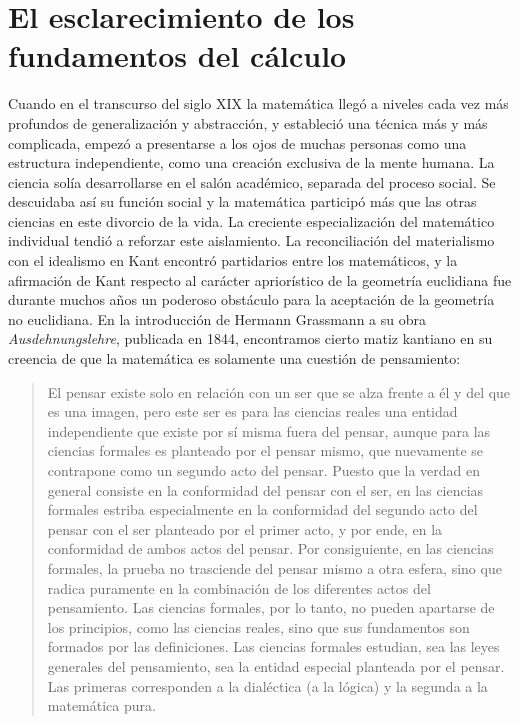 \documentclass[a4paper, 12pt]{article}
\begin{document}
{{\section*{El esclarecimiento de los fundamentos del
cálculo}

Cuando en el transcurso del siglo XIX la matemática llegó a niveles cada vez más
profundos de generalización y abstracción, y estableció una técnica más y más
complicada, empezó a presentarse a los ojos de muchas personas como una
estructura independiente, como una creación exclusiva de la mente humana. La
ciencia solía desarrollarse en el salón académico, separada del proceso social.
Se descuidaba así su función social y la matemática participó más que las otras
ciencias en este divorcio de la vida. La creciente especialización del
matemático individual tendió a reforzar este aislamiento. La reconciliación del
materialismo con el idealismo en Kant encontró partidarios entre los
matemáticos, y la afirmación de Kant respecto al carácter apriorístico de la
geometría euclidiana fue durante muchos años un poderoso obstáculo para la
aceptación de la geometría no euclidiana. En la introducción de Hermann
Grassmann a su obra \textit{Ausdehnungslehre}, publicada en 1844, encontramos
cierto matiz kantiano en su creencia de que la matemática es solamente una
cuestión de pensamiento:

\begin{quote}\small El pensar existe solo en relación con un ser que se alza
frente a él y del que es una imagen, pero este ser es para las ciencias reales
una entidad independiente que existe por sí misma fuera del pensar, aunque para
las ciencias formales es planteado por el pensar mismo, que nuevamente se
contrapone como un segundo acto del pensar. Puesto que la verdad en general
consiste en la conformidad del pensar con el ser, en las ciencias formales
estriba especialmente en la conformidad del segundo acto del pensar con el ser
planteado por el primer acto, y por ende, en la conformidad de ambos actos del
pensar. Por consiguiente, en las ciencias formales, la prueba no trasciende del
pensar mismo a otra esfera, sino que radica puramente en la combinación de los
diferentes actos del pensamiento. Las ciencias formales, por lo tanto, no pueden
apartarse de los principios, como las ciencias reales, sino que sus fundamentos
son formados por las definiciones. Las ciencias formales estudian, sea las leyes
generales del pensamiento, sea la entidad especial planteada por el pensar. Las
primeras corresponden a la dialéctica (a la lógica) y la segunda a la matemática
pura. \end{quote}

}}
\end{document}
